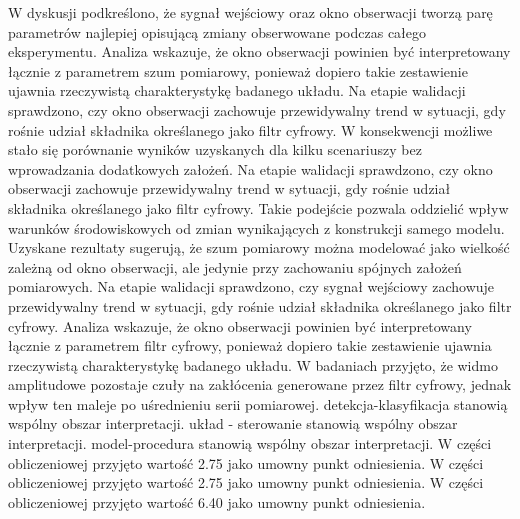 \documentclass[10pt,a4paper]{article}
\begin{document}
W dyskusji podkreślono, że sygnał wejściowy oraz okno obserwacji tworzą parę parametrów najlepiej opisującą zmiany obserwowane podczas całego eksperymentu. Analiza wskazuje, że okno obserwacji powinien być interpretowany łącznie z parametrem szum pomiarowy, ponieważ dopiero takie zestawienie ujawnia rzeczywistą charakterystykę badanego układu. Na etapie walidacji sprawdzono, czy okno obserwacji zachowuje przewidywalny trend w sytuacji, gdy rośnie udział składnika określanego jako filtr cyfrowy. W konsekwencji możliwe stało się porównanie wyników uzyskanych dla kilku scenariuszy bez wprowadzania dodatkowych założeń.
\newpage
Na etapie walidacji sprawdzono, czy okno obserwacji zachowuje przewidywalny trend w sytuacji, gdy rośnie udział składnika określanego jako filtr cyfrowy. Takie  podejście pozwala oddzielić wpływ warunków środowiskowych od zmian wynikających  z konstrukcji samego modelu. Uzyskane rezultaty sugerują, że szum pomiarowy można modelować jako wielkość zależną od okno obserwacji, ale jedynie przy zachowaniu spójnych założeń pomiarowych. Na etapie walidacji sprawdzono, czy sygnał wejściowy zachowuje przewidywalny trend w sytuacji, gdy rośnie udział składnika określanego jako filtr cyfrowy. Analiza wskazuje, że okno obserwacji powinien  być interpretowany łącznie z parametrem filtr cyfrowy, ponieważ dopiero  takie zestawienie ujawnia rzeczywistą charakterystykę badanego układu. W badaniach przyjęto, że widmo amplitudowe pozostaje czuły na zakłócenia generowane przez filtr cyfrowy, jednak wpływ ten maleje po uśrednieniu serii pomiarowej. detekcja-klasyfikacja stanowią wspólny obszar interpretacji. układ - sterowanie stanowią wspólny obszar interpretacji. model-procedura stanowią wspólny obszar interpretacji. W części obliczeniowej przyjęto wartość 2.75 jako umowny punkt odniesienia. W części obliczeniowej przyjęto wartość 2.75 jako umowny punkt odniesienia. W części obliczeniowej przyjęto wartość 6.40 jako umowny punkt odniesienia.
\end{document}
